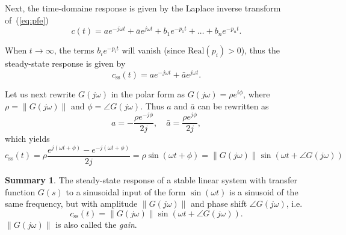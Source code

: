 \documentclass[a4paper,11pt]{report}
\theoremstyle{definition}
\newtheorem{mdsummary}{Summary}
\newenvironment{summary}%
  {\vspace{0.1cm}\begin{mdframed}[linecolor=red!60!black,
  linewidth=2pt]\begin{mdsummary}}%
  {\end{mdsummary}\end{mdframed}\vspace{0.1cm}}
\begin{document}
Next, the time-domaine response is given by the Laplace inverse
transform of~(\ref{eq:pfe})
\[
c(t) = a e^{-j\omega t} + \bar a e^{j\omega t} + b_1 e^{-p_1t} + \dots
+ b_n e^{-p_nt}.
\]

When $t\to \infty$, the terms $b_i e^{-p_it}$ will vanish (since
$\mathrm{Real}(p_i)>0$), thus the steady-state response is given by
\[
c_\mathrm{ss}(t) = a e^{-j\omega t} + \bar a e^{j\omega t}.
\]

Let us next rewrite $G(j\omega)$ in the polar form as $G(j\omega)=\rho
e^{i\phi}$, where $\rho = \|G(j\omega)\|$ and $\phi=\angle
G(j\omega)$.  Thus $a$ and $\bar a$ can be rewritten as
\[
a = -\frac{\rho e^{-j\phi}}{2j},\quad \bar a =\frac{\rho e^{j\phi}}{2j},
\]
which yields
\[
c_\mathrm{ss}(t) = \rho \frac{e^{j(\omega t+\phi)}-e^{-j(\omega
    t+\phi)}}{2j} = \rho \sin(\omega t + \phi)=
\|G(j\omega)\|\sin(\omega t +\angle G(j\omega))
\]

\begin{summary}
  \label{sum:fr}
  The steady-state response of a stable linear system with transfer
  function $G(s)$ to a sinusoidal input of the form $\sin(\omega t)$
  is a sinusoid of the same frequency, but with amplitude
  $\|G(j\omega)\|$ and phase shift $\angle G(j\omega)$, i.e.
  \[
  c_\mathrm{ss}(t) = \|G(j\omega)\|\sin\left(\omega t+\angle G(j\omega)\right).
  \]
  $\|G(j\omega)\|$ is also called the \emph{gain}.
\end{summary}
\end{document}
